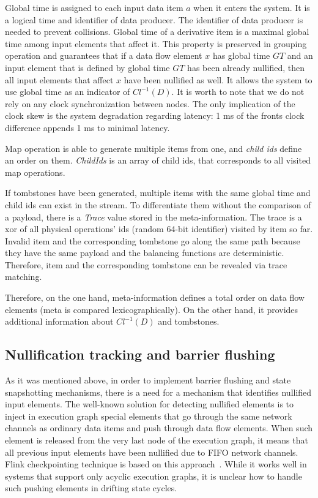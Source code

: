 Global time is assigned to each input data item $a$ when it enters the system. It is a logical time and identifier of data producer. The identifier of data producer is needed to prevent collisions. Global time of a derivative item is a maximal global time among input elements that affect it. This property is preserved in grouping operation and guarantees that if a data flow element $x$ has global time $GT$ and an input element that is defined by global time $GT$ has been already nullified, then all input elements that affect $x$ have been nullified as well. It allows the system to use global time as an indicator of $Cl^{-1}(D)$. It is worth to note that we do not rely on any clock synchronization between nodes. The only implication of the clock skew is the system degradation regarding latency: 1 ms of the fronts clock difference appends 1 ms to minimal latency.

Map operation is able to generate multiple items from one, and {\em child ids} define an order on them. {\it ChildIds} is an array of child ids, that corresponds to all visited map operations.

If tombstones have been generated, multiple items with the same global time and child ids can exist in the stream. To differentiate them without the comparison of a payload, there is a {\it Trace} value stored in the meta-information. The trace is a xor of all physical operations' ids (random 64-bit identifier) visited by item so far. Invalid item and the corresponding tombstone go along the same path because they have the same payload and the balancing functions are deterministic. Therefore, item and the corresponding tombstone can be revealed via trace matching. 

Therefore, on the one hand, meta-information defines a total order on data flow elements (meta is compared lexicographically). On the other hand, it provides additional information about $Cl^{-1}(D)$ and tombstones.

\subsection{Nullification tracking and barrier flushing}


As it was mentioned above, in order to implement barrier flushing and state snapshotting mechanisms, there is a need for a mechanism that identifies nullified input elements. The well-known solution for detecting nullified elements is to inject in execution graph special elements that go through the same network channels as ordinary data items and push through data flow elements. When such element is released from the very last node of the execution graph, it means that all previous input elements have been nullified due to FIFO network channels. Flink checkpointing technique is based on this approach~\cite{Carbone:2017:SMA:3137765.3137777}. While it works well in systems that support only acyclic execution graphs, it is unclear how to handle such pushing elements in drifting state cycles. 

